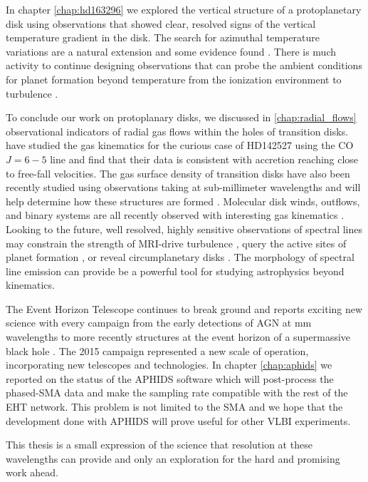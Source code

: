 In chapter \ref{chap:hd163296} we explored the vertical structure of a protoplanetary disk using 
observations that showed clear, resolved signs of the vertical temperature gradient in the disk.
The search for azimuthal temperature variations are a natural extension \citep{isella13} and 
some evidence found \citep{vanderplas14}.  There is much activity to continue designing
observations that can probe the ambient conditions 
for planet formation beyond temperature from the ionization environment \citep{cleeves14,teague15} to 
turbulence \citep{hughes11,guilloteau12,flock15,simon15}.

To conclude our work on protoplanary disks, we discussed in \ref{chap:radial_flows} observational indicators of 
radial gas flows within the holes of transition disks.  \citet{casassus15} have studied the gas kinematics for
the curious case of HD142527 using the CO $J = 6-5$ line and find that their data is consistent with
accretion reaching close to free-fall velocities.  The gas surface density of transition disks have also 
been recently studied using observations taking at sub-millimeter wavelengths 
\citep{bruderer14,zhang14,canovas15,perez15,vandermarel15} and will help determine how these structures are formed
\citep{bruderer13}.  Molecular disk winds, outflows, and binary systems are all recently observed 
with interesting gas kinematics \citep{klaasen13,dutrey14,williams14,salyk14,czekala15}.  Looking to the 
future, well resolved, highly sensitive observations of spectral lines may constrain the strength of MRI-drive
turbulence \citep{simon15}, query the active sites of planet formation \citep{kleeves15,ober15}, or reveal
circumplanetary disks \citep{perez15}.  The morphology of spectral line emission can provide be a powerful 
tool for studying astrophysics beyond kinematics.

The Event Horizon Telescope continues to break ground and reports exciting new science with every
campaign from the early detections of AGN at mm wavelengths \citep{doeleman05} to more recently structures
at the event horizon of a supermassive black hole \citep{doeleman08,doeleman09,doeleman13}.
The 2015 campaign represented a new scale of operation, incorporating new telescopes and
technologies.  In chapter \ref{chap:aphids} we reported on the status of the APHIDS software which
will post-process the phased-SMA data and make the sampling rate compatible with the rest of the EHT
network.  This problem is not limited to the SMA and we hope that the development done with APHIDS will
prove useful for other VLBI experiments. 

This thesis is a small expression of 
the science that resolution at these wavelengths can provide and only an exploration for the 
hard and promising work ahead.  
